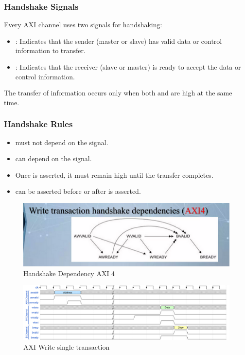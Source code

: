 \subsubsection{Handshake Signals}
Every AXI channel uses two signals for handshaking:

\begin{itemize}
    \item {}: Indicates that the sender (master or slave) has valid data or control information to transfer. 
    \item {}: Indicates that the receiver (slave or master) is ready to accept the data or control information. 
\end{itemize}
        
The transfer of information occurs only when both  and  are high at the same time.

\subsubsection{Handshake Rules}
\begin{itemize}
    \item  {} must not depend on the  signal.
    \item  {} can depend on the  signal.
    \item   Once  is asserted, it must remain high until the transfer completes.
    \item  {} can be asserted before or after  is asserted.
\end{itemize}

    

   

    

\begin{figure}[H]
    \centering
    \includegraphics[width=\linewidth]{images/dependency.png}
    \caption{Handshake Dependency AXI 4}
\end{figure}

\begin{figure}[H]
    \centering
    \includegraphics[width=\linewidth]{images/axi/axi_single_write.png}
    \caption{AXI Write single transaction}
\end{figure}

